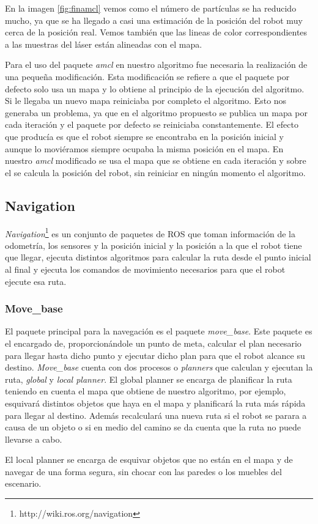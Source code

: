 En la imagen \ref{fig:finamcl} vemos como el número de partículas se ha reducido mucho, ya que se ha llegado a casi una estimación de la posición del robot muy cerca de la posición real. Vemos también que las lineas de color correspondientes a las muestras del láser están alineadas con el mapa.

Para el uso del paquete \textit{amcl} en nuestro algoritmo fue necesaria la realización de una pequeña modificación. Esta modificación se refiere a que el paquete por defecto solo usa un mapa y lo obtiene al principio de la ejecución del algoritmo. Si le llegaba un nuevo mapa reiniciaba por completo el algoritmo. Esto nos generaba un problema, ya que en el algoritmo propuesto se publica un mapa por cada iteración y el paquete por defecto se reiniciaba constantemente. El efecto que producía es que el robot siempre se encontraba en la posición inicial y aunque lo moviéramos siempre ocupaba la misma posición en el mapa. En nuestro \textit{amcl} modificado se usa el mapa que se obtiene en cada iteración y sobre el se calcula la posición del robot, sin reiniciar en ningún momento el algoritmo.

\subsection{Navigation}
\label{sec:navigation}
\textit{Navigation}\footnote{http://wiki.ros.org/navigation} es un conjunto de paquetes de ROS que toman información de la odometría, los sensores y la posición inicial y la posición a la que el robot tiene que llegar, ejecuta distintos algoritmos para calcular la ruta desde el punto inicial al final y ejecuta los comandos de movimiento necesarios para que el robot ejecute esa ruta.


\subsubsection{Move\_base}
\label{sec:movebase}
El paquete principal para la navegación es el paquete \textit{move\_base}\footnotemark. Este paquete es el encargado de, proporcionándole un punto de meta, calcular el plan necesario para llegar hasta dicho punto y ejecutar dicho plan para que el robot alcance su destino. \textit{Move\_base} cuenta con dos procesos o \textit{planners} que calculan y ejecutan la ruta, \textit{global} y \textit{local planner}. El global planner se encarga de planificar la ruta teniendo en cuenta el mapa que obtiene de nuestro algoritmo, por ejemplo, esquivará distintos objetos que haya en el mapa y planificará la ruta más rápida para llegar al destino. Además recalculará una nueva ruta si el robot se parara a causa de un objeto o si en medio del camino se da cuenta que la ruta no puede llevarse a cabo. 

El local planner se encarga de esquivar objetos que no están en el mapa y de navegar de una forma segura, sin chocar con las paredes o los muebles del escenario.
